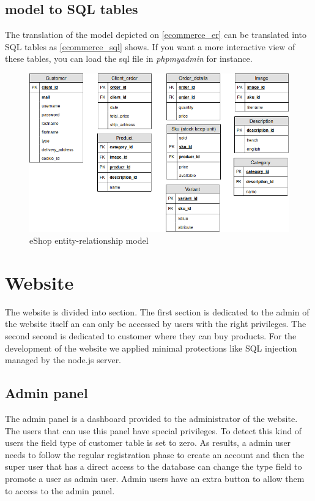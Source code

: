 \documentclass{article}
\begin{document}
\subsection{model to SQL tables}
The translation of the model depicted on \autoref{ecommerce_er} can be translated into SQL tables as \autoref{ecommerce_sql} shows. If you want a more interactive view of these tables, you can load the sql file in \textit{phpmyadmin} for instance.

\begin{figure}[h!]
    \centering
    \includegraphics[scale=0.4]{./images/ecommerce_SQL.png}
    \caption{eShop entity-relationship model}
    \label{ecommerce_sql}
\end{figure}

\section{Website}
The website is divided into section. The first section is dedicated to the admin of the website itself an can only be accessed by users with the right privileges. The second second is dedicated to customer where they can buy products. For the development of the website we applied minimal protections like SQL injection managed by the node.js server.

\subsection{Admin panel}
The admin panel is a dashboard provided to the administrator of the website. The users that can use this panel have special privileges. To detect this kind of users the field type of customer table is set to zero. As results, a admin user needs to follow the regular registration phase to create an account and then the super user that has a direct access to the database can change the type field to promote a user as admin user. Admin users have an extra button to allow them to access to the admin panel.\\
\end{document}
